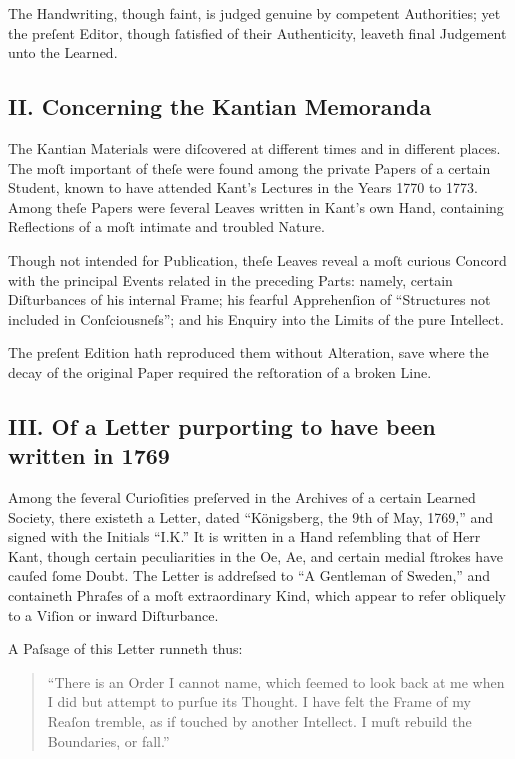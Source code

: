 \documentclass[12pt]{article}
\begin{document}
The Handwriting, though faint, is judged genuine by competent Authorities; yet 
the preſent Editor, though ſatisfied of their Authenticity, leaveth final 
Judgement unto the Learned.

\subsection*{II. Concerning the Kantian Memoranda}
The Kantian Materials were diſcovered at different times and in different 
places. The moſt important of theſe were found among the private Papers of a 
certain Student, known to have attended Kant’s Lectures in the Years 1770 to 
1773. Among theſe Papers were ſeveral Leaves written in Kant’s own Hand, 
containing Reflections of a moſt intimate and troubled Nature.

Though not intended for Publication, theſe Leaves reveal a moſt curious 
Concord with the principal Events related in the preceding Parts: namely, 
certain Diſturbances of his internal Frame; his fearful Apprehenſion of 
“Structures not included in Conſciousneſs”; and his Enquiry into the Limits of 
the pure Intellect.

The preſent Edition hath reproduced them without Alteration, save where the 
decay of the original Paper required the reſtoration of a broken Line.

\subsection*{III. Of a Letter purporting to have been written in 1769}
Among the ſeveral Curioſities preſerved in the Archives of a certain Learned 
Society, there existeth a Letter, dated “Königsberg, the 9th of May, 1769,” 
and signed with the Initials “I.K.” It is written in a Hand reſembling that of 
Herr Kant, though certain peculiarities in the Oe, Ae, and certain medial 
ſtrokes have cauſed ſome Doubt. The Letter is addreſsed to “A Gentleman of 
Sweden,” and containeth Phraſes of a moſt extraordinary Kind, which appear to 
refer obliquely to a Viſion or inward Diſturbance.

A Paſsage of this Letter runneth thus:

\begin{quote}
\small
“There is an Order I cannot name, which ſeemed to look back at me when I did 
but attempt to purſue its Thought. I have felt the Frame of my Reaſon tremble, 
as if touched by another Intellect. I muſt rebuild the Boundaries, or fall.”
\end{quote}
\end{document}
